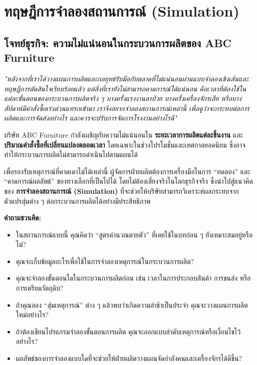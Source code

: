 \chapter{ทฤษฎีการจำลองสถานการณ์ (Simulation)}

\section*{โจทย์ธุรกิจ: ความไม่แน่นอนในกระบวนการผลิตของ ABC Furniture}

\begin{tcolorbox}[colback=white!100!white, colframe=black!80!white,
  title=ข้อความจากคุณสมชาย,
  fonttitle=\bfseries,
  sharp corners=southwest,
  boxrule=0.8pt,
  left=1mm, right=1mm, top=1mm, bottom=1mm,
]
\emph{
"หลังจากที่เราได้วางแผนการผลิตและกลยุทธ์รับมือกับตลาดที่ไม่แน่นอนผ่านแบบจำลองเชิงเส้นและทฤษฎีการตัดสินใจเรียบร้อยแล้ว  
แต่สิ่งที่เรายังไม่สามารถคาดการณ์ได้แน่นอน คือเวลาที่ต้องใช้ในแต่ละขั้นตอนของกระบวนการผลิตจริง ๆ  
บางครั้งแรงงานลาป่วย บางครั้งเครื่องจักรเสีย หรือบางสัปดาห์มีคำสั่งซื้อเร่งด่วนแทรกเข้ามา  
เราจึงอยากจำลองสถานการณ์เหล่านี้ เพื่อดูว่าจะกระทบต่อการผลิตและการจัดส่งอย่างไร และควรจะปรับการจัดการโรงงานอย่างไรดี"
}
\end{tcolorbox}

บริษัท ABC Furniture กำลังเผชิญกับความไม่แน่นอนใน \textbf{ระยะเวลาการผลิตแต่ละชิ้นงาน} และ \textbf{ปริมาณคำสั่งซื้อที่เปลี่ยนแปลงตลอดเวลา} โดยเฉพาะในช่วงโปรโมชั่นและเทศกาลยอดนิยม ซึ่งอาจทำให้กระบวนการผลิตไม่สามารถดำเนินไปตามแผนได้

เพื่อรองรับเหตุการณ์ที่คาดเดาไม่ได้เหล่านี้ ผู้จัดการฝ่ายผลิตต้องการเครื่องมือในการ “ทดลอง” และ “คาดการณ์ผลลัพธ์” ของทางเลือกที่เป็นไปได้ โดยไม่ต้องเสี่ยงจริงในโลกธุรกิจจริง ซึ่งนำไปสู่แนวคิดของ \textbf{การจำลองสถานการณ์ (Simulation)} ที่จะช่วยให้บริษัทสามารถวิเคราะห์ผลกระทบจากตัวแปรสุ่มต่าง ๆ ต่อกระบวนการผลิตได้อย่างมีประสิทธิภาพ

\bigskip

\noindent\textbf{คำถามชวนคิด:}
\begin{itemize}
    \item ในสถานการณ์แบบนี้ คุณคิดว่า “สูตรคำนวณตายตัว” ที่เคยใช้ในบทก่อน ๆ ยังเหมาะสมอยู่หรือไม่?
    \item คุณจะเก็บข้อมูลอะไรเพื่อใช้ในการจำลองเหตุการณ์ในกระบวนการผลิต?
    \item คุณจะจำลองขั้นตอนใดในกระบวนการผลิตก่อน เช่น เวลาในการประกอบสินค้า การขนส่ง หรือการเตรียมวัตถุดิบ?
    \item ถ้าคุณลอง “สุ่มเหตุการณ์” ต่าง ๆ แล้วพบว่าเกิดความล่าช้าเป็นประจำ คุณจะวางแผนการผลิตใหม่อย่างไร?
    \item ถ้าต้องเขียนโปรแกรมจำลองขั้นตอนการผลิต คุณจะออกแบบลำดับเหตุการณ์หรือเงื่อนไขไว้อย่างไร?
    \item ผลลัพธ์ของการจำลองแบบใดที่จะช่วยให้ฝ่ายผลิตวางแผนจัดกำลังคนและเครื่องจักรได้ดีขึ้น?
\end{itemize}

